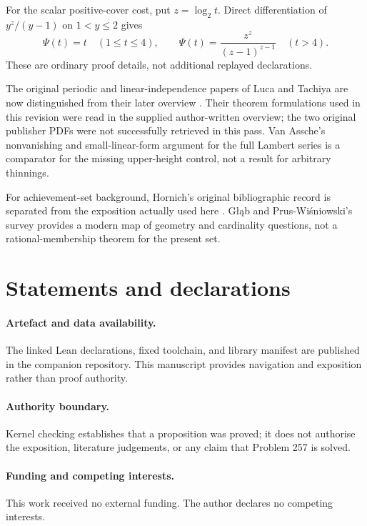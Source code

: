 For the scalar positive-cover cost, put $z=\log_2t$.  Direct differentiation
of $y^z/(y-1)$ on $1<y\le2$ gives
\[
 \Psi(t)=t\quad(1\le t\le4),\qquad
 \Psi(t)=\frac{z^z}{(z-1)^{z-1}}\quad(t>4).
\]
These are ordinary proof details, not additional replayed declarations.

The original periodic and linear-independence papers of Luca and Tachiya
are now distinguished from their later overview
\cite{lucatachiya2014periodic,lucatachiya2014independence,lucatachiya2017}.
Their theorem formulations used in this revision were read in the
supplied author-written overview; the two original publisher PDFs were
not successfully retrieved in this pass.  Van Assche's nonvanishing and
small-linear-form argument for the full Lambert series
\cite[Lemma~1 and (34)--(35)]{vanassche2001} is a comparator for the missing
upper-height control, not a result for arbitrary thinnings.

For achievement-set background, Hornich's original bibliographic record
\cite{hornich1941} is separated from the exposition actually used here
\cite{nitecki2013}.  G\l\k{a}b and Prus-Wi\'sniowski's survey
\cite{glabprus2025} provides a modern map of geometry and cardinality
questions, not a rational-membership theorem for the present set.

\section*{Statements and declarations}

\paragraph{Artefact and data availability.} The linked Lean declarations,
fixed toolchain, and library manifest are published in the companion
repository. This manuscript provides navigation and exposition rather than
proof authority.

\paragraph{Authority boundary.} Kernel checking establishes that a proposition
was proved; it does not authorise the exposition, literature judgements, or any
claim that Problem 257 is solved.

\paragraph{Funding and competing interests.} This work received no external
funding. The author declares no competing interests.

